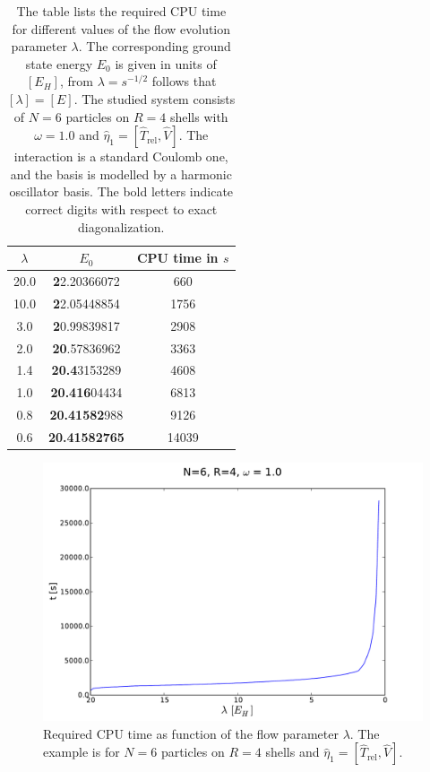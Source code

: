\begin{table}
\begin{center}
\begin{tabular}{c c c}
\hline\hline
 $\lambda$ & $E_0$ & CPU time in $s$ \\
 \hline
 20.0 & \textbf{2}2.20366072 & 660 \\
 10.0 & \textbf{2}2.05448854 & 1756 \\
 3.0  & \textbf{2}0.99839817 & 2908  \\
 2.0  & \textbf{20}.57836962 & 3363 \\
 1.4  & \textbf{20.4}3153289 & 4608 \\
 1.0 & \textbf{20.416}04434 & 6813 \\
 0.8 & \textbf{20.41582}988 & 9126 \\
 0.6 & \textbf{20.41582765} & 14039 \\
\hline\hline
\end{tabular}
\end{center}
\caption{The table lists the required CPU time for different values of the flow evolution parameter $\lambda$. The corresponding ground state energy $E_0$  is given in units of $\left[E_H\right]$, from $\lambda = s^{-1/2}$ follows that $\left[\lambda\right] = \left[ E \right]$. The studied system consists of $N=6$ particles on $R=4$ shells with $\omega=1.0$ and $\hat{\eta}_1 = \left[ \hat{T}_{\text{rel}}, \hat{V}\right]$. The interaction is a standard Coulomb one, and the basis is modelled by a harmonic oscillator basis. The bold letters indicate correct digits with respect to exact diagonalization. }
\label{tab:timeAnalysis}
\end{table}

\begin{figure}
\begin{center}
\includegraphics[scale=0.35]{../Plots/time1.pdf}
\caption{Required CPU time as function of the flow parameter $\lambda$. The example is for $N=6$ particles on $R=4$ shells and $\hat{\eta}_1 = \left[ \hat{T}_{\text{rel}}, \hat{V}\right]$.}
\label{fig:time1}
\end{center}
\end{figure}

